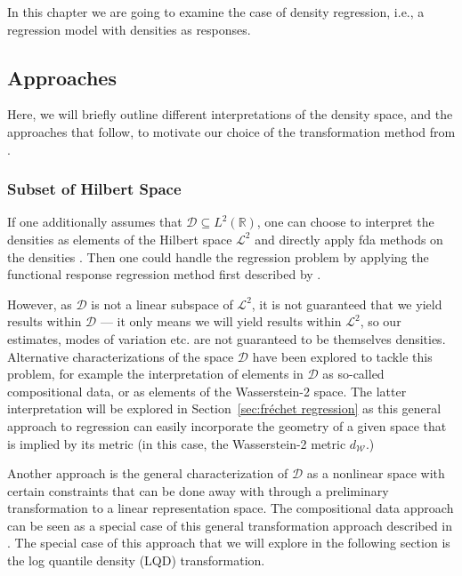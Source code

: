 In this chapter we are going to examine the case of density regression, i.e., a
regression model with densities as responses.

\subsection{Approaches}
\label{sec:approaches}
Here, we will briefly outline different interpretations of the density space, and the
approaches that follow, to motivate our choice of the transformation method from
\textcites{PetersenMüller2016}{KokoszkaEtAl2019}.

\subsubsection{Subset of Hilbert Space}
\label{sec:l2_interpretation}
If one additionally assumes that $\mathcal{D} \subseteq L^2(\mathbb{R})$, one can choose
to interpret the densities as elements of the Hilbert space $\mathcal{L}^2$ and directly
apply fda methods on the densities \parencite[see e.g.][]{KneipUtikal2001}. Then one
could handle the regression problem by applying the functional response regression method
first described by \textcite{Faraway1997}.

However, as $\mathcal{D}$ is not a linear subspace of $\mathcal{L}^2$, it is not guaranteed that
we yield results within $\mathcal{D}$ --- it only means we will yield results within $\mathcal{L}^2$,
so our estimates, modes of variation etc. are not guaranteed to be themselves densities.
Alternative characterizations of the space $\mathcal{D}$ have been explored to tackle
this problem, for example the interpretation of elements in $\mathcal{D}$ as so-called
compositional data, or as elements of the Wasserstein-2 space. The latter
interpretation will be explored in Section~\ref{sec:fréchet regression} as this general
approach to regression can easily incorporate the geometry of a given space that is
implied by its metric (in this case, the Wasserstein-2 metric $d_\mathcal{W}$.)

Another approach is the general characterization of $\mathcal{D}$ as a nonlinear space
with certain constraints that can be done away with through a preliminary transformation
to a linear representation space. The compositional data approach can be seen as a
special case of this general transformation approach described in \textcite{PetersenMüller2016}.
The special case of this approach that we will explore in the following section is the
log quantile density (LQD) transformation.

